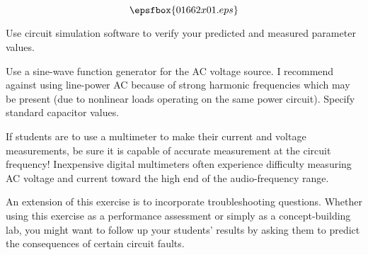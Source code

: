 

$$\epsfbox{01662x01.eps}$$

\vfil \eject






Use circuit simulation software to verify your predicted and measured parameter values.







Use a sine-wave function generator for the AC voltage source.  I recommend against using line-power AC because of strong harmonic frequencies which may be present (due to nonlinear loads operating on the same power circuit).  Specify standard capacitor values.

If students are to use a multimeter to make their current and voltage measurements, be sure it is capable of accurate measurement at the circuit frequency!  Inexpensive digital multimeters often experience difficulty measuring AC voltage and current toward the high end of the audio-frequency range.

An extension of this exercise is to incorporate troubleshooting questions.  Whether using this exercise as a performance assessment or simply as a concept-building lab, you might want to follow up your students' results by asking them to predict the consequences of certain circuit faults.




